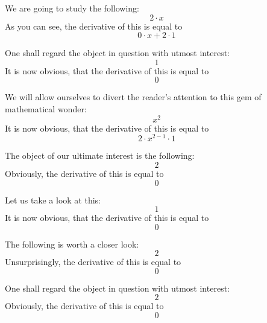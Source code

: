 \documentclass{article}
\begin{document}
We are going to study the following:
\begin{equation}
2 \cdot x 
\end{equation}
As you can see, the derivative of this is equal to
\begin{equation}
0 \cdot x + 2 \cdot 1 
\end{equation}

One shall regard the object in question with utmost interest:
\begin{equation}
1 
\end{equation}
It is now obvious, that the derivative of this is equal to
\begin{equation}
0 
\end{equation}

We will allow ourselves to divert the reader's attention to this gem of mathematical wonder:
\begin{equation}
x ^{2 } 
\end{equation}
It is now obvious, that the derivative of this is equal to
\begin{equation}
2 \cdot x ^{2 - 1 } \cdot 1 
\end{equation}

The object of our ultimate interest is the following:
\begin{equation}
2 
\end{equation}
Obviously, the derivative of this is equal to
\begin{equation}
0 
\end{equation}

Let us take a look at this:
\begin{equation}
1 
\end{equation}
It is now obvious, that the derivative of this is equal to
\begin{equation}
0 
\end{equation}

The following is worth a closer look:
\begin{equation}
2 
\end{equation}
Unsurprisingly, the derivative of this is equal to
\begin{equation}
0 
\end{equation}

One shall regard the object in question with utmost interest:
\begin{equation}
2 
\end{equation}
Obviously, the derivative of this is equal to
\begin{equation}
0 
\end{equation}
\end{document}
